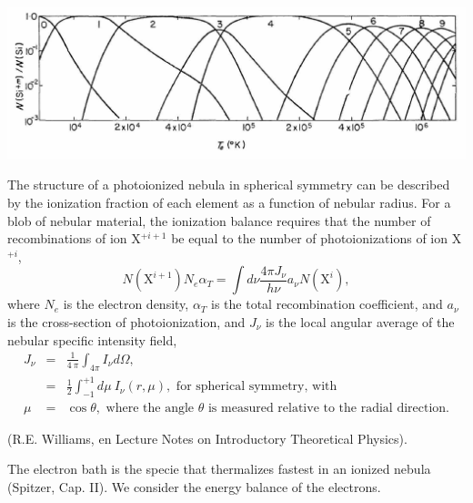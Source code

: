 \begin{center}
  \includegraphics[width=25cm,height=!]{./C/colion_eq.jpg}
\end{center}



The structure of a photoionized nebula in spherical symmetry can be
described by the ionization fraction of each element as a function of
nebular radius. For a blob of nebular material, the ionization balance
requires that the number of recombinations of ion X$^{+i+1}$ be equal 
to the number of photoionizations of  ion X$^{+i}$,
\begin{equation}
N(\mathrm{X}^{i+1}) N_{e} \alpha_{T} = {\int}d{\nu} \frac{4\pi J_{\nu}}{h\nu}
a_{\nu} N(\mathrm{X}^{i}), 
\label{eq:ionisation_balance}
\end{equation}
where $N_{e}$ is the electron density, $\alpha_{T}$ is the total
recombination coefficient, and $a_{\nu}$ is the cross-section of
photoionization, and $J_{\nu}$ is the local angular average of the
nebular specific intensity field, 
\begin{eqnarray}
J_{\nu}  & =  & \frac{1}{4~\pi}\int_{4 \pi} I_\nu d\Omega , \nonumber \\
 & = & \frac{1}{2}\int_{-1}^{+1} d\mu ~I_\nu(r,\mu), \text{~for
 spherical symmetry, with } \nonumber  \\ 
\mu &  =  & \cos \theta, \text{~where the angle   $\theta$ is measured
 relative to the radial direction.} \nonumber
\end{eqnarray}




(R.E. Williams, en Lecture Notes on Introductory Theoretical
Physics). 

The electron bath is the specie that thermalizes fastest in an ionized
nebula (Spitzer, Cap. II). We consider the energy balance of the electrons.

